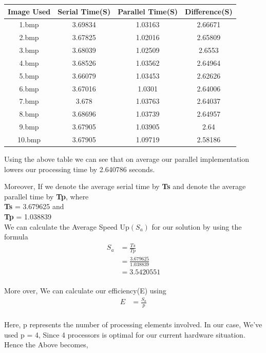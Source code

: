 \documentclass[paper=a4, fontsize=11pt]{scrartcl} %
\numberwithin{equation}{section} %
\numberwithin{figure}{section} %
\numberwithin{table}{section} %
\begin{document}
\begin{center}

\begin{tabular}{||c |c |c |c ||}
\hline
\textbf{Image Used} & \textbf{Serial Time(S)} & \textbf{Parallel Time(S)} & \textbf{Difference(S)} \\[0.5ex]
\hline \hline

1.bmp & 3.69834 & 1.03163 & 2.66671 \\
2.bmp & 3.67825 & 1.02016 & 2.65809\\
3.bmp & 3.68039 & 1.02509 & 2.6553\\
4.bmp & 3.68526 & 1.03562 & 2.64964\\
5.bmp & 3.66079 & 1.03453 & 2.62626\\
6.bmp & 3.67016 & 1.0301 & 2.64006\\
7.bmp & 3.678 & 1.03763 & 2.64037\\
8.bmp & 3.68696 & 1.03739  & 2.64957\\
9.bmp & 3.67905 & 1.03905 & 2.64\\
10.bmp & 3.67905 & 1.09719 & 2.58186\\[1ex]

\hline

\end{tabular}

\end{center}

Using the above table we can see that on average our parallel implementation lowers our processing time by 2.640786 seconds.


Moreover, If we denote the average serial time by \textbf{Ts} and denote the average parallel time by \textbf{Tp}, where \\
\textbf{Ts} = 3.679625 and \\
\textbf{Tp} = 1.038839 \\
We can calculate the Average Speed Up$(S_a)$ for our solution by using the formula
\begin{equation}
\begin{split}
S_a &= \frac{Ts}{Tp}  \\
	&=\frac{3.679625}{1.038839}  \\
	&=3.5420551
\end{split}
\end{equation}\\
More over, We can calculate our efficiency(E) using 
\begin{equation}
\begin{split}
E &= \frac{S_a}{p}
\end{split}
\end{equation}\\
Here, p represents the number of processing elements involved. In our case, We've used p = 4, Since 4 processors is optimal for our current hardware situation. Hence the Above becomes,
\end{document}
